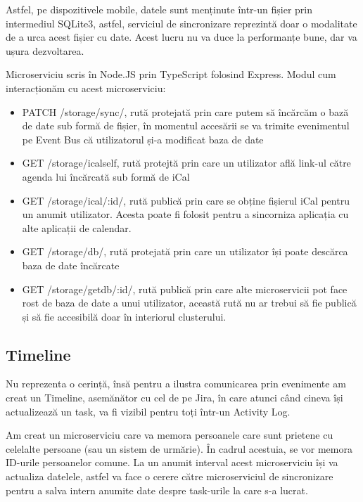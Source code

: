Astfel, pe dispozitivele mobile, datele sunt menținute într-un fișier prin intermediul SQLite3, astfel,
serviciul de sincronizare reprezintă doar o modalitate de a urca acest fișier cu date. Acest lucru
nu va duce la performanțe bune, dar va ușura dezvoltarea.

Microserviciu scris în Node.JS prin TypeScript folosind Express.
Modul cum interacționăm cu acest microserviciu:

\begin{itemize}
      \item PATCH /storage/sync/, rută protejată prin care putem să încărcăm o bază de date sub formă de fișier,
            în momentul accesării se va trimite evenimentul pe Event Bus că utilizatorul și-a modificat baza de date
      \item GET /storage/icalself, rută protejtă prin care un utilizator află link-ul către agenda lui încărcată sub formă de iCal
      \item GET /storage/ical/:id/, rută publică prin care se obține fișierul iCal pentru un anumit utilizator. Acesta poate fi folosit pentru a sincorniza aplicația cu alte aplicații de calendar.
      \item GET /storage/db/, rută protejată prin care un utilizator își poate descărca baza de date încărcate
      \item GET /storage/getdb/:id/, rută publică prin care alte microservicii pot face rost de baza de date a unui utilizator, această rută nu ar trebui să fie publică și să fie accesibilă doar în interiorul clusterului.
\end{itemize}

\subsection{Timeline}

Nu reprezenta o cerință, însă pentru a ilustra comunicarea prin evenimente am creat un Timeline, asemănător cu cel
de pe Jira, în care atunci când cineva își actualizează un task, va fi vizibil pentru toți într-un Activity Log.

Am creat un microserviciu care va memora persoanele care sunt prietene cu celelalte persoane (sau un sistem de urmărie).
În cadrul acestuia, se vor memora ID-urile persoanelor comune. La un anumit interval acest microserviciu își va actualiza datelele,
astfel va face o cerere către microserviciul de sincronizare pentru a salva intern anumite date despre task-urile la care s-a lucrat.

